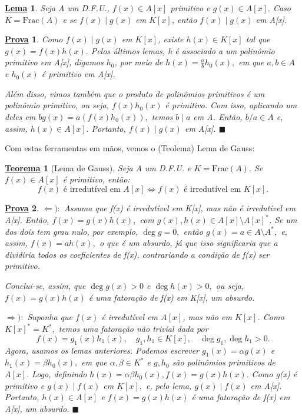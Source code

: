 \documentclass{article}
\newtheorem*{theorem*}{\underline{Teorema}}
\newtheorem*{lemma*}{\underline{Lema}}
\newtheorem*{proof*}{\underline{Prova}}
\renewcommand\qedsymbol{$\blacksquare$}
\begin{document}
    \begin{lemma*}
      Seja A um D.F.U., \(f(x)\in A[x]\) primitivo e \(g(x)\in A[x].\) Caso \(K = \mathrm{Frac}(A)\) e se \(f(x)\mid g(x)\) em \(K[x]\), então
      \(f(x)\mid g(x)\) em A[x].
    \end{lemma*}
    \begin{proof*}
      Como \(f(x)\mid g(x)\) em \(K[x]\), existe \(h(x)\in K[x]\) tal que \(g(x) = f(x)h(x).\) Pelos últimos lemas,
      h é associado a um polinômio primitivo em A[x], digamos \(h_{0}\), por meio de \(h(x) = \frac{a}{b}h_{0}(x),\) em que \(a, b\in A\) e 
      \(h_{0}(x)\) é primitivo em A[x].

      Além disso, vimos também que o produto de polinômios primitivos é um polinômio primitivo, ou seja, \(f(x)h_{0}(x)\) é primitivo. Com isso,
      aplicando um deles em \(bg(x) = a(f(x)h_{0}(x)),\) temos \(b\mid a\) em A. Então, \(b/a\in A\) e, assim, \(h(x)\in A[x].\)
      Portanto, \(f(x)\mid g(x)\) em A[x]. \qedsymbol
    \end{proof*}
    Com estas ferramentas em mãos, vemos o (Teolema) Lema de Gauss:
    \begin{theorem*}[Lema de Gauss]
      Seja A um D.F.U. e \(K = \mathrm{Frac}(A).\) Se \(f(x)\in A[x]\) é primitivo, então:
      \[
        f(x) \text{ é irredutível em }A[x] \Longleftrightarrow f(x) \text{ é irredutível em }K[x].
      \]
    \end{theorem*}
    \begin{proof*}
      \(\Leftarrow ):\) Assuma que f(x) é irredutível em K[x], mas não é irredutível em A[x]. Então, \(f(x) = g(x)h(x),\) com 
      \(g(x), h(x)\in A[x]\setminus{A[x]^{*}}\). Se um dos dois tem grau nulo, por exemplo, \(\deg{g} = 0, \) então
      \(g(x) = a\in A\setminus{A^{*}},\) e, assim, \(f(x) = ah(x),\) o que é um absurdo, já que isso significaria que 
      a dividiria todos os coeficientes de f(x), contrariando a condição de f(x) ser primitivo.

      Conclui-se, assim, que \(\deg{g(x)} > 0\) e \(\deg{h(x)} > 0,\) ou seja, \(f(x) = g(x)h(x)\) é uma fatoração de 
      f(x) em K[x], um absurdo.

      \(\Rightarrow ):\) Suponha que \(f(x)\) é irredutível em \(A[x]\), mas não em \(K[x]\). Como \(K[x]^{*} = K^{*},\) temos uma
      fatoração não trivial dada por 
      \[
        f(x) = g_{1}(x)h_{1}(x),\quad g_{1}, h_{1}\in K[x],\quad \deg{g_{1}}, \deg{h_{1}} > 0.
      \]
      Agora, usamos os lemas anteriores. Podemos escrever \(g_{1}(x) = \alpha g(x)\) e \(h_{1}(x) = \beta h_{0}(x),\) em que \(\alpha , \beta \in K^{*}\)
      e \(g, h_{0}\) são polinômios primitivos de \(A[x].\) Logo, definindo \(h(x) = \alpha \beta h_{0}(x), f(x) = g(x)h(x).\) Como g(x) é primitivo e 
      \(g(x)\mid f(x)\) em \(K[x],\) e, pelo lema, \(g(x)\mid f(x)\) em A[x]. Portanto, \(h(x)\in A[x]\) e \(f(x) = g(x)h(x)\) é uma fatoração de f(x) em A[x],
      um absurdo. \qedsymbol
    \end{proof*}
\end{document}
